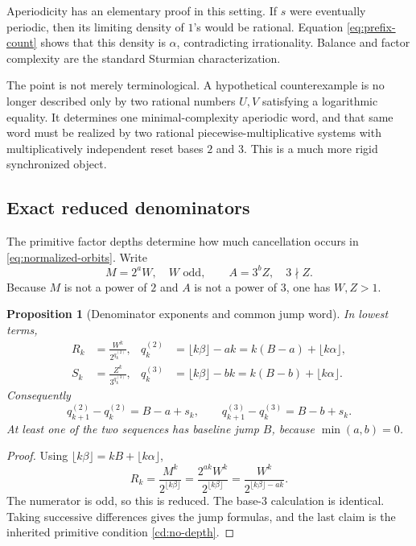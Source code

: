 \documentclass[11pt,oneside]{article}
\newtheorem{proposition}[theorem]{Proposition}
\theoremstyle{definition}
\theoremstyle{remark}
\begin{document}
Aperiodicity has an elementary proof in this setting.  If $s$ were eventually periodic, then
its limiting density of $1$'s would be rational.  Equation \eqref{eq:prefix-count} shows that
this density is $\alpha$, contradicting irrationality.  Balance and factor complexity are the
standard Sturmian characterization.

The point is not merely terminological.  A hypothetical counterexample is no longer described
only by two rational numbers $U,V$ satisfying a logarithmic equality.  It determines one
minimal-complexity aperiodic word, and that same word must be realized by two rational
piecewise-multiplicative systems with multiplicatively independent reset bases $2$ and $3$.
This is a much more rigid synchronized object.

\subsection{Exact reduced denominators}

The primitive factor depths determine how much cancellation occurs in
\eqref{eq:normalized-orbits}.  Write
\[
  M=2^aW,\quad W\text{ odd},
  \qquad
  A=3^bZ,\quad 3\nmid Z.
\]
Because $M$ is not a power of $2$ and $A$ is not a power of $3$, one has $W,Z>1$.

\begin{proposition}[Denominator exponents and common jump word]\label{prop:denominators}
In lowest terms,
\begin{align}
  R_k&=\frac{W^k}{2^{q^{(2)}_k}},
  &q^{(2)}_k&=\lfloor k\beta\rfloor-ak
              =k(B-a)+\lfloor k\alpha\rfloor,\label{eq:q2}\\
  S_k&=\frac{Z^k}{3^{q^{(3)}_k}},
  &q^{(3)}_k&=\lfloor k\beta\rfloor-bk
              =k(B-b)+\lfloor k\alpha\rfloor.\label{eq:q3}
\end{align}
Consequently
\[
  q^{(2)}_{k+1}-q^{(2)}_k=B-a+s_k,
  \qquad
  q^{(3)}_{k+1}-q^{(3)}_k=B-b+s_k.
\]
At least one of the two sequences has baseline jump $B$, because $\min(a,b)=0$.
\end{proposition}

\begin{proof}
Using $\lfloor k\beta\rfloor=kB+\lfloor k\alpha\rfloor$,
\[
 R_k=\frac{M^k}{2^{\lfloor k\beta\rfloor}}
     =\frac{2^{ak}W^k}{2^{\lfloor k\beta\rfloor}}
     =\frac{W^k}{2^{\lfloor k\beta\rfloor-ak}}.
\]
The numerator is odd, so this is reduced.  The base-$3$ calculation is identical.  Taking
successive differences gives the jump formulas, and the last claim is the inherited
primitive condition \eqref{cd:no-depth}.
\end{proof}
\end{document}
